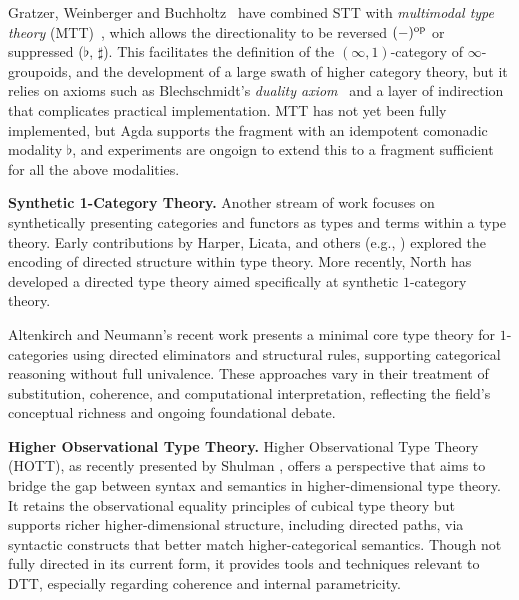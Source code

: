 \documentclass[a4paper,11pt]{article}
\renewcommand{\paragraph}[1]{\textbf{#1.}}
\begin{document}
Gratzer, Weinberger and Buchholtz~\cite{gratzer2024directed,gratzer2025yoneda} have combined STT with \emph{multimodal type theory} (MTT)~\cite{gratzer:2020}, which allows
the directionality to be reversed $(-)^{\textup{op}}$ or suppressed (\(\flat\), \(\sharp\)).
This facilitates the definition of the $(\infty,1)$-category of $\infty$-groupoids,
and the development of a large swath of higher category theory, but it relies on axioms
such as Blechschmidt's \emph{duality axiom}~\cite{blechschmidt:2023}
and a layer of
indirection that complicates practical implementation.
MTT has not yet been fully implemented, but Agda supports the fragment with an
idempotent comonadic modality $\flat$, and experiments are ongoign to extend this to a fragment sufficient for all the above modalities.

\paragraph{Synthetic 1-Category Theory}
%
Another stream of work focuses on synthetically presenting categories
and functors as types and terms within a type theory. Early
contributions by Harper, Licata, and others (e.g., \cite{licata:2011})
explored the encoding of directed structure within type theory. More
recently, North has developed a directed type theory \cite{north_2019}
aimed specifically at synthetic $1$-category theory.

Altenkirch and Neumann’s recent work
\cite{altenkirch_neumann_2024} presents a minimal core type theory for
$1$-categories using directed eliminators and structural rules,
supporting categorical reasoning without full univalence. These
approaches vary in their treatment of substitution, coherence, and
computational interpretation, reflecting the field's conceptual
richness and ongoing foundational debate.

\paragraph{Higher Observational Type Theory}
Higher Observational Type Theory (HOTT), as recently presented by
Shulman \cite{shulman2022}, offers a perspective that aims to bridge
the gap between syntax and semantics in higher-dimensional type
theory. It retains the observational equality principles of cubical
type theory but supports richer higher-dimensional structure,
including directed paths, via syntactic constructs that better match
higher-categorical semantics. Though not fully directed in its current
form, it provides tools and techniques relevant to DTT, especially
regarding coherence and internal parametricity.
\end{document}
